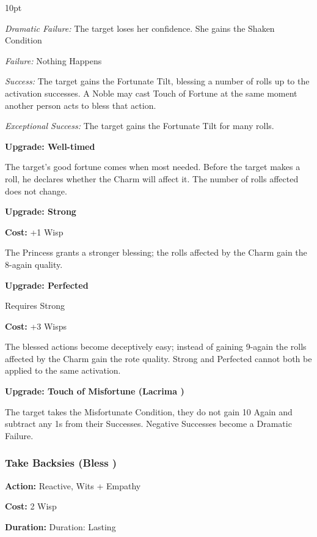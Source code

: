 \begin{myindentpar}{10pt}

\emph{Dramatic Failure:} The target loses her confidence. She gains the Shaken Condition

\emph{Failure:} Nothing Happens 

\emph{Success:}  The target gains the Fortunate Tilt, blessing a number of rolls up to the activation successes. A Noble may cast Touch of Fortune at the same moment another person acts to bless that action.

\emph{Exceptional Success:} The target gains the Fortunate Tilt for many rolls.

\textbf{Upgrade: Well-timed}

The target's good fortune comes when most needed. Before the target makes a roll, he declares whether the Charm will affect it. The number of rolls affected does not change. 

\textbf{Upgrade: Strong}

\noindent \textbf{Cost:} +1 Wisp

The Princess grants a stronger blessing; the rolls affected by the Charm gain the 8-again quality.

\textbf{Upgrade: Perfected}

Requires Strong

\noindent \textbf{Cost:} +3 Wisps

The blessed actions become deceptively easy; instead of gaining 9-again the rolls affected by the Charm gain the rote quality. Strong and Perfected cannot both be applied to the same activation.

\textbf{Upgrade: Touch of Misfortune (Lacrima \textbullet\textbullet)}

The target takes the Misfortunate Condition, they do not gain 10 Again and subtract any 1s from their Successes. Negative Successes become a Dramatic Failure. 

\end{myindentpar}

\subsubsection*{Take Backsies (Bless \textbullet\textbullet)}

\noindent \textbf{Action:} Reactive, Wits + Empathy

\noindent \textbf{Cost:} 2 Wisp

\noindent \textbf{Duration:} Duration: Lasting \\

